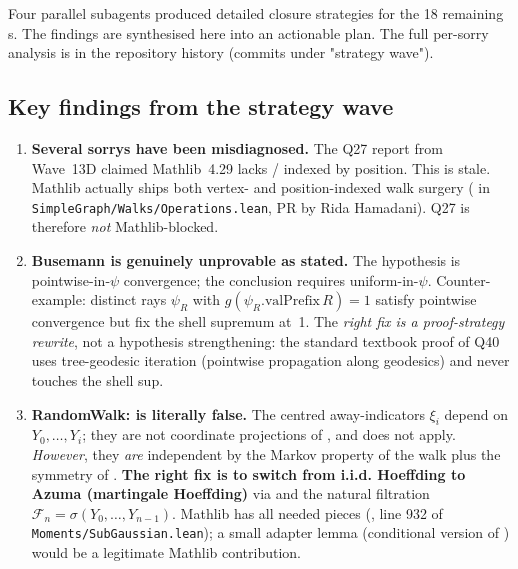 \documentclass[11pt,a4paper]{article}
\newcommand{\cmd}[1]{\texttt{\small #1}}
\theoremstyle{plain}
\theoremstyle{definition}
\begin{document}
Four parallel subagents produced detailed closure strategies for the
18 remaining s. The findings are synthesised here into an
actionable plan. The full per-sorry analysis is in the repository
history (commits under "strategy wave").

\subsection{Key findings from the strategy wave}

\begin{enumerate}[leftmargin=1.3em]
\item \textbf{Several sorrys have been misdiagnosed.} The Q27 report
from Wave~13D claimed Mathlib~4.29 lacks
/ indexed by position. This is
stale. Mathlib actually ships both vertex- and position-indexed walk
surgery ( in
\cmd{SimpleGraph/Walks/Operations.lean}, PR by Rida Hamadani). Q27 is
therefore \emph{not} Mathlib-blocked.

\item \textbf{Busemann  is
genuinely unprovable as stated.} The hypothesis is pointwise-in-$\psi$
convergence; the conclusion requires uniform-in-$\psi$. Counter-example:
distinct rays $\psi_R$ with $g(\psi_R.\text{valPrefix}\,R) = 1$ satisfy
pointwise convergence but fix the shell supremum at~1. The \emph{right
fix is a proof-strategy rewrite}, not a hypothesis strengthening: the
standard textbook proof of Q40 uses tree-geodesic iteration
(pointwise propagation along geodesics) and never touches the shell sup.

\item \textbf{RandomWalk:  is literally
false.} The centred away-indicators $\xi_i$ depend on $Y_0, \ldots, Y_i$;
they are not coordinate projections of , and
 does not apply. \emph{However}, they
\emph{are} independent by the Markov property of the walk plus the
symmetry of . \textbf{The right fix is to switch
from i.i.d. Hoeffding to Azuma (martingale Hoeffding)} via
 and the natural filtration
$\mathcal F_n = \sigma(Y_0, \ldots, Y_{n-1})$. Mathlib has all needed
pieces (, line
932 of \cmd{Moments/SubGaussian.lean}); a small adapter lemma
(conditional version of )
would be a legitimate Mathlib contribution.


\end{enumerate}
\end{document}
